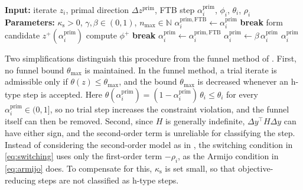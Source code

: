 \documentclass[class=scrbook, crop=false]{standalone}
\begin{document}
\begin{algorithm}[htbp]
\caption{Two-type line search}
\label{alg:two_phase_line_search}
\begin{algorithmic}[1]
\State \textbf{Input:} iterate $z_i$, primal direction $\Delta z^{\mathrm{prim}}$, \gls{FTB} step $\alpha_i^{\mathrm{prim}}$, $\phi_i$, $\theta_i$, $\rho_i$
\State \textbf{Parameters:} $\kappa_{\mathrm{s}} > 0$, $\gamma, \beta \in (0,1)$, $n_{\mathrm{max}} \in \mathbb{N}$
\State $\alpha_i^{\mathrm{prim},\mathrm{FTB}} \gets \alpha_i^{\mathrm{prim}}$
     
        \State \textbf{break} 
    \EndIf
    \State form candidate $z^{+}(\alpha_i^{\mathrm{prim}})$
    \State compute $\phi^{+}$
     
        \State \textbf{break}
    \EndIf
        \State $\alpha_i^{\mathrm{prim}} \gets \alpha_i^{\mathrm{prim},\mathrm{FTB}}$ 
    \Else
        \State $\alpha_i^{\mathrm{prim}} \gets \beta\,\alpha_i^{\mathrm{prim}}$
    \EndIf
\EndFor
\State \Return $\alpha_i^{\mathrm{prim}}$
\end{algorithmic}
\end{algorithm}

Two simplifications distinguish this procedure from the funnel method of \cite{kiesslingUnifiedFunnelRestoration2025}.
First, no funnel bound $\theta_{\mathrm{max}}$ is maintained.
In the funnel method, a trial iterate is admissible only if $\theta(z) \le \theta_{\mathrm{max}}$,
and the bound $\theta_{\mathrm{max}}$ is decreased whenever an h-type step is accepted.
Here $\theta(\alpha_i^{\mathrm{prim}}) = (1-\alpha_i^{\mathrm{prim}})\,\theta_i \le \theta_i$ for every $\alpha_i^{\mathrm{prim}} \in (0,1]$,
so no trial step increases the constraint violation, and the funnel itself can then be removed.
Second, since $H$ is generally indefinite, 
$\Delta y^\top H \Delta y$ can have either sign, and the second-order term is unreliable for classifying the step.
Instead of considering the second-order model as in \cite{kiesslingUnifiedFunnelRestoration2025},
the switching condition in \eqref{eq:switching} uses only the first-order term $-\rho_i$, as the Armijo condition in \eqref{eq:armijo} does.
To compensate for this, $\kappa_{\mathrm{s}}$ is set small, so that objective-reducing steps are not classified as h-type steps.
\end{document}
